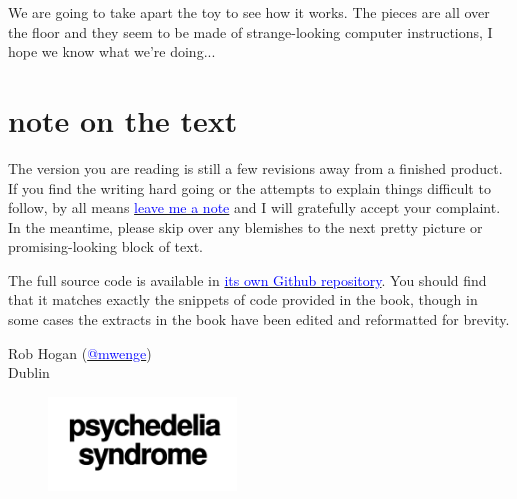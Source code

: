 We are going to take apart the toy to see how it works. The pieces are all over the floor and they seem to be made
of strange-looking computer instructions, I hope we know what we're doing...


\section*{note on the text}
The version you are reading is still a few revisions away from a
finished product. If you find the writing hard going or the attempts to explain things difficult
to follow, by all means \href{https://github.com/mwenge/psypixels/issues}{\textcolor{blue}{leave me a note}} and
I will gratefully accept your complaint. In the meantime, please skip over any blemishes
to the next pretty picture or promising-looking block of text.

The full source code is available in \href{https://github.com/mwenge/psychedelia}{\textcolor{blue}{its own Github repository}}. 
You should find that it matches exactly the snippets of code provided in the book, though in some cases the extracts in the book have been edited
and reformatted for brevity.


Rob Hogan (\href{https://mastodon.social/@mwenge}{\textcolor{blue}{@mwenge}})\\
Dublin \the\year{} \\

\clearpage
\vspace*{\fill}
\begin{figure}[H]
    \centering
      \includegraphics[width=5cm]{src/cover/title_page.png}%
\end{figure}
\vspace*{\fill}
\thispagestyle{empty}%
\clearpage

